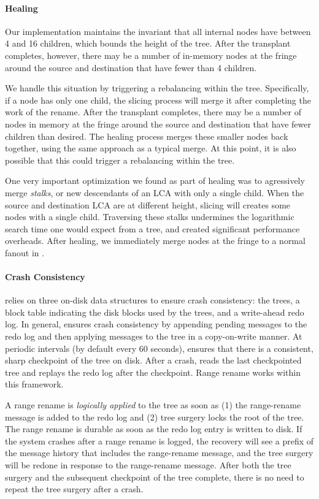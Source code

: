 \paragraph{Healing}  Our \bet implementation maintains the
invariant that all internal nodes have between 4 and 16 children,
which bounds the height of the tree.  After the transplant completes,
however, there may be a number of in-memory \bet nodes at the fringe
around the source and destination that have fewer than 4 children.

We handle this situation by triggering a rebalancing within the tree.
Specifically, if a node has only one child, the slicing process will merge
it after completing the work of the rename.
After the transplant completes, there may be a number
of \bet nodes in memory at the fringe around the
source and destination that have fewer children than desired.
The healing process merges these smaller nodes back together,
using the same approach as a typical \bet merge.  At this point, it is also
possible that this could trigger a rebalancing within the tree.

One very important optimization we found as part of healing was to
agressively merge {\em stalks}, or new descendants of an LCA with
only a single child.
When the source and destination LCA are at different height, slicing
will creates some nodes with a single child.
Traversing these stalks undermines the logarithmic search time one would
expect from a tree, and created significant performance overheads.
After healing, we immediately merge nodes at the fringe
to a normal fanout in \bet.

\paragraph{Crash Consistency} \betrfs relies on three on-disk data structures to
ensure crash consistency: the trees, a block table indicating the disk blocks
used by the trees, and a write-ahead redo log. In general, \betrfs ensures crash
consistency by appending pending messages to the redo log and then applying
messages to the tree in a copy-on-write manner.
At periodic intervals (by default every 60 seconds), \betrfs ensures that there
is a consistent, sharp checkpoint of the tree on disk.
After a crash, \betrfs reads the last checkpointed tree and replays the redo log
after the checkpoint.
Range rename works within this framework.

A range rename is {\em logically applied} to the tree as soon as
(1) the range-rename message is added to the redo log and
(2) tree surgery locks the root of the tree.
The range rename is durable as soon as the redo log entry is written to disk.
If the system crashes after a range rename is logged, the recovery will see a
prefix of the message history that includes the range-rename message, and the
tree surgery will be redone in response to the range-rename message.
After both the tree surgery and the subsequent checkpoint of the tree complete,
there is no need to repeat the tree surgery after a crash.

